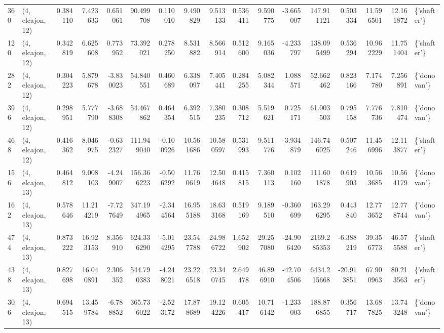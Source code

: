 \begin{tabular}{llrrrrrrrrrrrrrrl}
360 &  (4, elcajon, 12) &   0.384110 &   7.423633 &   0.651061 &    90.499708 &   0.110010 &   9.490829 &   9.513133 &  0.536411 &   9.590775 &  -3.665007 &   147.911121 &   0.503334 &  11.596501 &  12.161872 &  \{'shafter'\} \\
120 &  (4, elcajon, 12) &   0.342819 &   6.625608 &   0.773952 &    73.392021 &   0.278250 &   8.531882 &   8.566914 &  0.512600 &   9.165036 &  -4.233797 &   138.095499 &   0.536294 &  10.962229 &  11.751404 &  \{'shafter'\} \\
282 &  (4, elcajon, 12) &   0.304223 &   5.879678 &  -3.830023 &    54.840551 &   0.460689 &   6.338097 &   7.405441 &  0.284255 &   5.082344 &   1.088571 &    52.662462 &   0.823166 &   7.174780 &   7.256891 &  \{'donovan'\} \\
396 &  (4, elcajon, 12) &   0.298951 &   5.777790 &  -3.688308 &    54.467862 &   0.464354 &   6.392515 &   7.380235 &  0.308712 &   5.519621 &   0.725171 &    61.003503 &   0.795158 &   7.776736 &   7.810474 &  \{'donovan'\} \\
468 &  (4, elcajon, 12) &   0.416362 &   8.046975 &  -0.632327 &   111.949040 &  -0.100926 &  10.561686 &  10.580597 &  0.531993 &   9.511776 &  -3.934879 &   146.746025 &   0.507246 &  11.456996 &  12.113877 &  \{'shafter'\} \\
156 &  (4, elcajon, 13) &   0.464812 &   9.008103 &  -4.249007 &   156.366223 &  -0.506292 &  11.760619 &  12.504648 &  0.415815 &   7.360113 &   0.102160 &   111.601878 &   0.619903 &  10.563685 &  10.564179 &  \{'donovan'\} \\
162 &  (4, elcajon, 13) &   0.578646 &  11.214219 &  -7.727649 &   347.194965 &  -2.344564 &  16.955188 &  18.633168 &  0.519169 &   9.189510 &  -0.360699 &   163.296295 &   0.443840 &  12.773652 &  12.778744 &  \{'donovan'\} \\
474 &  (4, elcajon, 13) &   0.873222 &  16.923153 &   8.356910 &   624.336290 &  -5.014295 &  23.547788 &  24.986722 &  1.652902 &  29.257080 & -24.906420 &  2169.285353 &  -6.388219 &  39.356773 &  46.575588 &  \{'shafter'\} \\
438 &  (4, elcajon, 13) &   0.827698 &  16.040891 &   2.306352 &   544.790383 &  -4.248021 &  23.226518 &  23.340745 &  2.649478 &  46.896910 & -42.704506 &  6434.215668 & -20.913851 &  67.900963 &  80.213563 &  \{'shafter'\} \\
306 &  (4, elcajon, 13) &   0.694515 &  13.459784 &  -6.788852 &   365.736022 &  -2.523172 &  17.878689 &  19.124226 &  0.605417 &  10.716142 &  -1.233003 &   188.876855 &   0.356717 &  13.687825 &  13.743248 &  \{'donovan'\} \\

\end{tabular}
